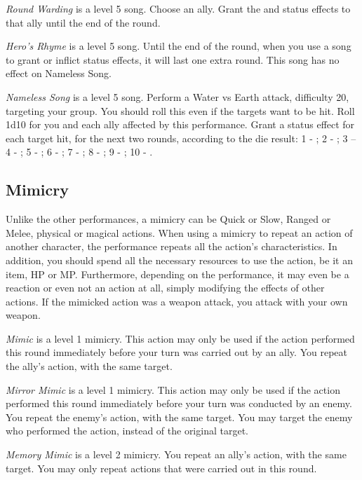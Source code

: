 \begin{multicols}{2}
    \textit{Round Warding} is a level 5 song. Choose an ally. Grant the  and  status effects to that ally until the end of the round.
    
	\textit{Hero's Rhyme} is a level 5 song. Until the end of the round, when you use a song to grant or inflict status effects, it will last one extra round. This song has no effect on Nameless Song.
    
    \textit{Nameless Song} is a level 5 song. Perform a Water vs Earth attack, difficulty 20, targeting your group. You should roll this even if the targets want to be hit. Roll 1d10 for you and each ally affected by this performance. Grant a status effect for each target hit, for the next two rounds, according to the die result: 1 - ; 2 - ; 3 –  4 - ; 5 - ; 6 - ; 7 - ; 8 - ; 9 - ; 10 - .
 
    \subsection{Mimicry}
    \label{subsec:perf-mimicry}

	Unlike the other performances, a mimicry can be Quick or Slow, Ranged or Melee, physical or magical actions. When using a mimicry to repeat an action of another character, the performance repeats all the action’s characteristics. In addition, you should spend all the necessary resources to use the action, be it an item, HP or MP. Furthermore, depending on the performance, it may even be a reaction or even not an action at all, simply modifying the effects of other actions. If the mimicked action was a weapon attack, you attack with your own weapon.
    
    \textit{Mimic} is a level 1 mimicry. This action may only be used if the action performed this round immediately before your turn was carried out by an ally. You repeat the ally’s action, with the same target.
    
    \textit{Mirror Mimic} is a level 1 mimicry. This action may only be used if the action performed this round immediately before your turn was conducted by an enemy. You repeat the enemy’s action, with the same target. You may target the enemy who performed the action, instead of the original target.
    
    \textit{Memory Mimic} is a level 2 mimicry. You repeat an ally’s action, with the same target. You may only repeat actions that were carried out in this round.


\end{multicols}
